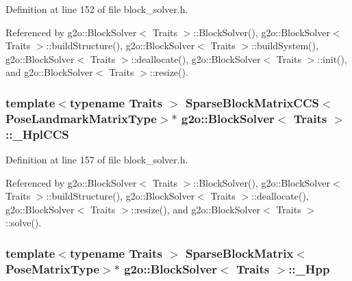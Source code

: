Definition at line 152 of file block\+\_\+solver.\+h.



Referenced by g2o\+::\+Block\+Solver$<$ Traits $>$\+::\+Block\+Solver(), g2o\+::\+Block\+Solver$<$ Traits $>$\+::build\+Structure(), g2o\+::\+Block\+Solver$<$ Traits $>$\+::build\+System(), g2o\+::\+Block\+Solver$<$ Traits $>$\+::deallocate(), g2o\+::\+Block\+Solver$<$ Traits $>$\+::init(), and g2o\+::\+Block\+Solver$<$ Traits $>$\+::resize().

\subsubsection[{\texorpdfstring{\+\_\+\+Hpl\+C\+CS}{_HplCCS}}]{\setlength{\rightskip}{0pt plus 5cm}template$<$typename Traits $>$ {\bf Sparse\+Block\+Matrix\+C\+CS}$<${\bf Pose\+Landmark\+Matrix\+Type}$>$$\ast$ {\bf g2o\+::\+Block\+Solver}$<$ Traits $>$\+::\+\_\+\+Hpl\+C\+CS\hspace{0.3cm}{\ttfamily [protected]}}\hypertarget{classg2o_1_1BlockSolver_ab54eb7bb13f8b3a8a5f135a98f2050ec}{}\label{classg2o_1_1BlockSolver_ab54eb7bb13f8b3a8a5f135a98f2050ec}


Definition at line 157 of file block\+\_\+solver.\+h.



Referenced by g2o\+::\+Block\+Solver$<$ Traits $>$\+::\+Block\+Solver(), g2o\+::\+Block\+Solver$<$ Traits $>$\+::build\+Structure(), g2o\+::\+Block\+Solver$<$ Traits $>$\+::deallocate(), g2o\+::\+Block\+Solver$<$ Traits $>$\+::resize(), and g2o\+::\+Block\+Solver$<$ Traits $>$\+::solve().

\subsubsection[{\texorpdfstring{\+\_\+\+Hpp}{_Hpp}}]{\setlength{\rightskip}{0pt plus 5cm}template$<$typename Traits $>$ {\bf Sparse\+Block\+Matrix}$<${\bf Pose\+Matrix\+Type}$>$$\ast$ {\bf g2o\+::\+Block\+Solver}$<$ Traits $>$\+::\+\_\+\+Hpp\hspace{0.3cm}{\ttfamily [protected]}}\hypertarget{classg2o_1_1BlockSolver_ac222d4342825ed8632a87b4f5be94618}{}\label{classg2o_1_1BlockSolver_ac222d4342825ed8632a87b4f5be94618}



